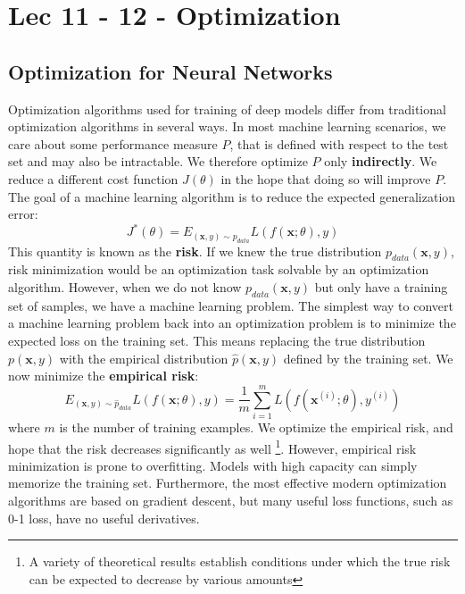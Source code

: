 \chapter{Lec 11 - 12 - Optimization}

\section{Optimization for Neural Networks}
Optimization algorithms used for training of deep models differ from traditional optimization algorithms in several ways. In most machine learning scenarios, we care about some performance measure
$P$, that is defined with respect to the test set and may also be intractable. We therefore optimize $P$ only \textbf{indirectly}. We reduce a different cost function $J(\theta)$ in the hope that doing so will improve $P$.\newline\newline
The goal of a machine learning algorithm is to reduce the expected generalization error:
\[J^*(\theta) = E_{(\textbf{x}, y) \sim p_{data}} L(f(\textbf{x}; \theta), y)\]
This quantity is known as the \textbf{risk}. If we knew the true distribution
$p_{data}(\textbf{x}, y)$, risk minimization would be an optimization task solvable by an optimization algorithm. However, when we do not know $p_{data}(\textbf{x}, y)$ but only have a training set of samples, we have a machine learning problem. The simplest way to convert a machine learning problem back into an optimization problem is to minimize the expected loss on the training set. This means replacing the true distribution $p(\textbf{x}, y)$ with the empirical distribution $\hat{p}(\textbf{x}, y)$ defined by the training set. We now minimize the \textbf{empirical risk}:
\[E_{(\textbf{x}, y) \sim \hat{p}_{data}} L(f(\textbf{x}; \theta), y) = \frac{1}{m}\sum_{i=1}^m L(f(\textbf{x}^{(i)}; \theta), y^{(i)})\]
where $m$ is the number of training examples. We optimize the empirical risk, and hope that the risk decreases significantly as well \footnote{A variety of theoretical results establish conditions under which the true risk can be expected to decrease by various amounts}. However, empirical risk minimization is prone to overfitting. Models with high capacity can simply memorize the training set. Furthermore, the most effective modern optimization algorithms are based on gradient descent, but many useful loss functions, such as 0-1 loss, have no useful derivatives.

